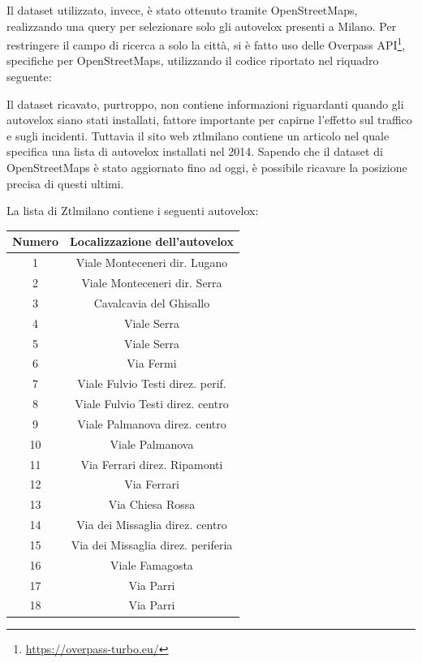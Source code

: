 \documentclass[a4paper,12pt]{report}
\begin{document}
Il dataset utilizzato, invece, è stato ottenuto tramite OpenStreetMaps, 
realizzando una query per selezionare solo gli autovelox presenti a Milano. 
Per restringere il campo di ricerca a solo la città, si è fatto uso delle 
Overpass API\footnote{\url{https://overpass-turbo.eu/}}, 
specifiche per OpenStreetMaps, utilizzando il codice riportato nel riquadro seguente: 



Il dataset ricavato, purtroppo, non contiene informazioni riguardanti quando gli 
autovelox siano stati installati, fattore importante per capirne l'effetto 
sul traffico e sugli incidenti.
Tuttavia il sito web ztlmilano \cite{ZTLMILANO:1}
contiene un articolo nel quale specifica una lista di 
autovelox installati nel 2014. 
Sapendo che il dataset di OpenStreetMaps è stato aggiornato fino ad oggi, 
è possibile ricavare la posizione precisa di questi ultimi.

La lista di Ztlmilano contiene i seguenti autovelox: 

\begin{center}
    \def\arraystretch{1.5}%
    \begin{tabular}{ |c|c| } 
    \hline
    Numero & Localizzazione dell'autovelox \\ 
    \hline
    \rowcolor{TableGray}
    1   &   Viale Monteceneri  dir. Lugano\\
    2   &   Viale Monteceneri dir. Serra\\
    \rowcolor{TableGray}
    3   &   Cavalcavia del Ghisallo\\
    4   &   Viale Serra \\
    \rowcolor{TableGray}
    5   &   Viale Serra\\
    6   &   Via Fermi\\
    \rowcolor{TableGray}
    7   &   Viale Fulvio Testi direz. perif.\\
    8   &   Viale Fulvio Testi direz. centro\\
    \rowcolor{TableGray}
    9   &   Viale Palmanova  direz. centro\\
    10  &   Viale Palmanova\\
    \rowcolor{TableGray}
    11  &   Via Ferrari direz. Ripamonti\\
    12  &   Via Ferrari\\
    \rowcolor{TableGray}
    13  &   Via Chiesa Rossa\\
    14  &   Via dei Missaglia direz. centro\\
    \rowcolor{TableGray}
    15  &   Via dei Missaglia direz. periferia\\
    16  &   Viale Famagosta\\
    \rowcolor{TableGray}
    17  &   Via Parri\\
    18  &   Via Parri\\
    \hline
    \end{tabular}
    \label{ztl-milano}
\end{center}
\end{document}
